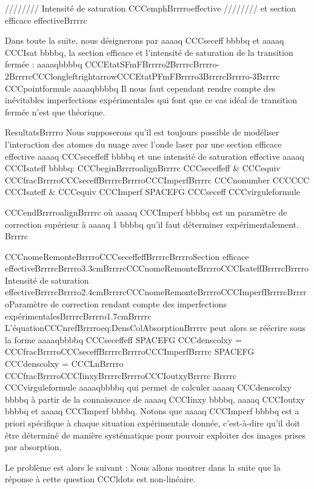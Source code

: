 //////// Intensité de saturation CCCemphBrrrroeffective ////////
 et section efficace effectiveBrrrrc

Dans toute la suite, nous désignerons par aaaaq CCCseceff bbbbq et aaaaq CCCIsat bbbbq, la section efficace et l'intensité de saturation de la transition fermée :
aaaaqbbbbq
CCCEtatSFmFBrrrro2BrrrrcBrrrro-2BrrrrcCCClongleftrightarrowCCCEtatPFmFBrrrro3BrrrrcBrrrro-3Brrrrc
CCCpointformule
aaaaqbbbbq
Il nous faut cependant rendre compte des inévitables imperfections expérimentales qui font que ce cas idéal de transition fermée n'est que théorique. 




ResultatsBrrrro
Nous supposerons qu'il est toujours possible de modéliser l'interaction des atomes du nuage avec l'onde laser par une section efficace effective aaaaq CCCseceffeff bbbbq et une intensité de saturation effective aaaaq CCCIsateff bbbbq:
CCCbeginBrrrroalignBrrrrc
	CCCseceffeff & CCCequiv CCCfracBrrrroCCCseceffBrrrrcBrrrroCCCImperfBrrrrc CCCnonumber CCCCCC
	CCCIsateff & CCCequiv CCCImperf SPACEFG CCCseceff 
	CCCvirguleformule
	
CCCendBrrrroalignBrrrrc
où aaaaq CCCImperf bbbbq est un paramètre de correction supérieur à aaaaq 1 bbbbq qu'il faut déterminer expérimentalement. 
Brrrrc



CCCnomeRemonteBrrrroCCCseceffeffBrrrrcBrrrroSection efficace effectiveBrrrrcBrrrro3.3cmBrrrrcCCCnomeRemonteBrrrroCCCIsateffBrrrrcBrrrroIntensité de saturation effectiveBrrrrcBrrrro2.4cmBrrrrcCCCnomeRemonteBrrrroCCCImperfBrrrrcBrrrroParamètre de correction rendant compte des imperfections expérimentalesBrrrrcBrrrro1.7cmBrrrrc
L'équationCCCnrefBrrrroeq:DensColAbsorptionBrrrrc peut alors se réécrire sous la forme
aaaaqbbbbq
	CCCseceffeff  SPACEFG  CCCdenscolxy = CCCfracBrrrroCCCseceffBrrrrcBrrrroCCCImperfBrrrrc  SPACEFG  CCCdenscolxy 
	= 	CCCLnBrrrro	CCCfracBrrrroCCCIinxyBrrrrcBrrrroCCCIoutxyBrrrrc	Brrrrc
CCCvirguleformule
aaaaqbbbbq
qui permet de calculer aaaaq CCCdenscolxy bbbbq à partir de la connaissance de aaaaq CCCIinxy bbbbq, aaaaq CCCIoutxy bbbbq et aaaaq CCCImperf bbbbq.
Notons que aaaaq CCCImperf bbbbq est a priori spécifique à chaque situation expérimentale donnée, c'est-à-dire qu'il doit être déterminé de manière systématique pour pouvoir exploiter des images prises par absorption.



Le problème est alors le suivant : 
Nous allons montrer dans la suite que la réponse à cette question CCCldots est non-linéaire.

